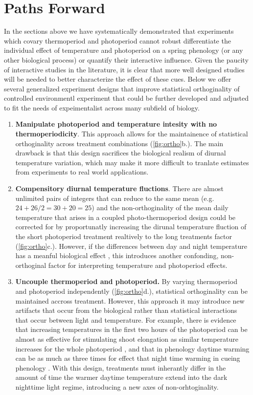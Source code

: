 \documentclass[11pt]{article}
\begin{document}
\section{Paths Forward}
In the sections above we have systematically demonstrated that experiments which covary thermoperiod and photoperiod cannot robust differentiate the individual effect of temperature and photoperiod on a spring phenology (or any other biological process) or quantify their interactive influence. Given the paucity of interactive studies in the literature, it is clear that more well designed studies will be needed to better characterize the effect of these cues. Below we offer several generalized experiment designs that improve statistical orthoginality of controlled environmentl experiment that could be further developed and adjusted to fit the needs of expeimentalist across many subfield of biology.
\begin{enumerate}
\item \textbf{Manipulate photoperiod and temperature intesity with no thermoperiodicity}. This approach allows for the maintainence of statistical orthoginality across treatment combinations (\ref{fig:ortho}b.). The main drawback is that this design sacrifices the biological realism of diurnal temperature variation, which may make it more difficult to tranlate estimates from experiments to real world applications.

 
\item \textbf{Compensitory diurnal temperature fluctions}. There are almost unlimited pairs of integers that can reduce to the same mean (e.g. $24+26/2 = 30+20 = 25$) and the non-orthoginality of the mean daily temperature that arises in a coupled photo-thermoperiod design could be corrected for by proportunatly increasing the dirunal temperature fluction of the short photoperiod treatment realtively to the long treatments  factor (\ref{fig:ortho}c.). However, if the differences between day and night temperature has a meanful biological effect \citep{}, this introduces another confonding, non-orthoginal factor for interpreting temperature and photoperiod effects.


\item \textbf{Uncouple thermoperiod and photoperiod.} By varying thermoperiod and photoperiod independently (\ref{fig:ortho}d.), statistical orthoginality can be maintained accross treatment. However, this approach it may introduce new artifacts that occur from the biological rather than statistical interactions that occur between light and temperature. For example, there is evidence that increasing temperatures in the first two hours of the photoperiod can be almost as effective for stimulating shoot elongation as similar temperature increases for the whole photoperiod \citep{Erwin1998}, and that in phenology daytime warming can be as much as three times for effect that night time warming in cueing phenology \citep{}. With this design, treatments must inherantly differ in the amount of time the warmer daytime temperature extend into the dark nighttime light regime, introducing a new axes of non-orhtoginality.
\end{enumerate}
\end{document}
